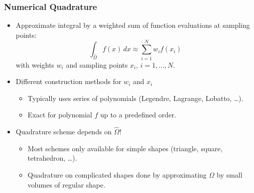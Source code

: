 \documentclass[aspectratio=169,11pt]{beamer}
\theoremstyle{definition}
\newcommand{\diffd}{\,d}
\begin{document}
\begin{frame}
  \frametitle{Numerical Quadrature}
  \begin{itemize}
  \item Approximate integral by a weighted sum of function evaluations at sampling points:
  \begin{equation*}
    \int_{\hat\Omega} f(x) \diffd x \approx \sum_{i = 1}^N w_i f(x_i)
  \end{equation*}
  with weights $w_i$ and sampling points $x_i$, $i = 1,\dots,N$.\\[1em]
\item Different construction methods for $w_i$ and $x_i$
  \begin{itemize}
  \item Typically uses series of polynomials (Legendre, Lagrange, Lobatto, \dots).
  \item Exact for polynomial $f$ up to a predefined order.
  \end{itemize}
\item Quadrature scheme depends on $\hat\Omega$!
  \begin{itemize}
  \item Most schemes only available for simple shapes (triangle, square, tetrahedron, \dots).
  \item Quadrature on complicated shapes done by approximating $\Omega$ by small volumes of regular shape.
  \end{itemize}
  \end{itemize}
\end{frame}
\end{document}
